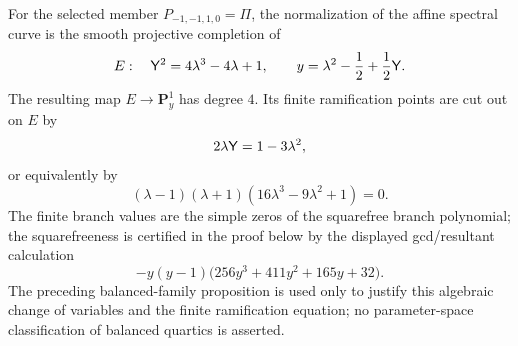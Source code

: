 \begin{theorem}\label{thm:theorem-a-balanced-elliptic-normalization}
For the selected member $P_{-1,-1,1,0}=\Pi$, the normalization of the affine spectral curve is the smooth projective completion of
\[
E:\quad \mathsf{Y}^2=4\lambda^3-4\lambda+1,
\qquad
 y=\lambda^2-\frac12+\frac12\mathsf{Y}.
\]
The resulting map $E\to\mathbf P^1_y$ has degree $4$.  Its finite ramification points are cut out on $E$ by
\begin{equation}\label{eq:canonical-ramification-differential}
2\lambda\mathsf{Y}=1-3\lambda^2,
\end{equation}
or equivalently by
\begin{equation}\label{eq:canonical-lambda-ramification-poly}
(\lambda-1)(\lambda+1)(16\lambda^3-9\lambda^2+1)=0.
\end{equation}
The finite branch values are the simple zeros of the squarefree branch polynomial; the squarefreeness is certified in the proof below by the displayed gcd/resultant calculation
\begin{equation}\label{eq:canonical-branch-polynomial}
-y(y-1)\bigl(256y^3+411y^2+165y+32\bigr).
\end{equation}
The preceding balanced-family proposition is used only to justify this algebraic change of variables and the finite ramification equation; no parameter-space classification of balanced quartics is asserted.
\end{theorem}

